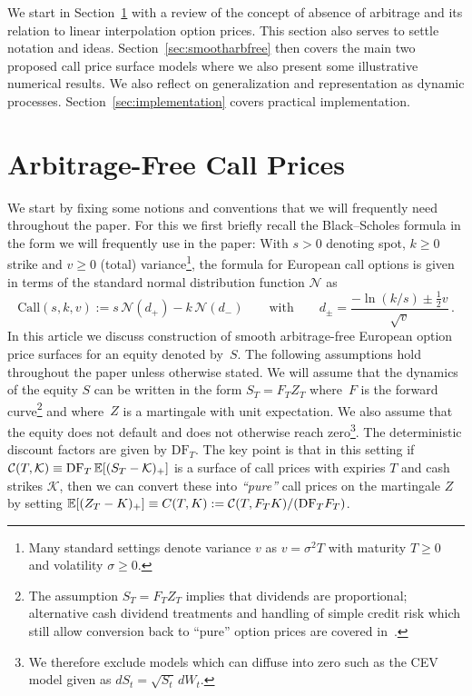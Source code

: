 \documentclass[twoside]{article}
\theoremstyle{plain}
\theoremstyle{definition}
\theoremstyle{remark}
\begin{document}
We start in Section~\ref{sec:review} with a review of the concept of absence of arbitrage and its relation to linear interpolation option prices. This section also serves
to settle notation and ideas.
Section~\ref{sec:smootharbfree} then covers the main two proposed call price surface models where we also present some illustrative numerical results. We also reflect on generalization
and representation as dynamic processes. Section~\ref{sec:implementation} covers practical implementation. 


\section{Arbitrage-Free Call Prices}\label{sec:review}
We start by fixing some notions and conventions that we will frequently need throughout the paper. 
For this we first briefly recall  the Black--Scholes formula in the form we will frequently use in the paper:  With $s>0$ denoting spot,  $k\geq 0$ strike and $v\ge 0$ (total) variance\footnote{Many standard settings
denote variance $v$ as $v=\sigma^2 T$ with maturity $T\ge 0$ and volatility $\sigma\ge 0$.
}, the formula for European call options is given in terms of the
standard normal distribution function $\mathcal{N}$ as
\begin{equation}\label{eq:bsc}
    \mathrm{Call}(s,k,v) := s\,\mathcal{N}(d_+) - k\,\mathcal{N}(d_-) \qquad\text{with}\qquad
    d_\pm = \frac{-\ln(k/s)\pm \frac12 v}{\sqrt{v}} \, .
\end{equation}
 In this article we discuss construction of smooth arbitrage-free European option price surfaces for an equity denoted by~$S$. The following assumptions hold throughout the paper unless otherwise stated.
We will assume that the dynamics of the equity $S$ can be written in the form 
$S_T = F_T Z_T$ where~$F$ is the forward curve\footnote{
    The assumption $S_T=F_T Z_T$ implies that dividends are proportional; alternative cash dividend treatments and 
handling of simple credit risk which still allow conversion back to ``pure'' option prices are covered in~\cite{BuehlerVolAndDivs}.
} 
and where~$Z$ is a martingale with unit expectation. We also assume that the equity does not
default and does not otherwise reach zero\footnote{
We therefore exclude models which can diffuse into zero such as the CEV model given as $dS_t=\sqrt{S_t}\,dW_t$.
}. 
The deterministic discount factors are given by $\mathrm{DF}_T$. The key point is that in this setting 
if $\mathcal{C}(T,\mathcal{K})\equiv \mathrm{DF}_T\, \mathbb{E}[ (S_T-\mathcal{K})_+ ]$ is a surface of call prices with expiries $T$ and cash strikes $\mathcal{K}$, then we can convert 
these into \textit{``pure''} call prices on the martingale $Z$ by setting $\mathbb{E}[ (Z_T-K)_+] \equiv C(T,K) := \mathcal{C}(T,F_T K)/(\mathrm{DF}_T F_T)$.
\end{document}
